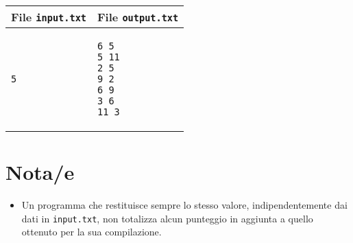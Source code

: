 \documentclass[a4paper,11pt]{article}
\begin{document}
    \noindent
    \begin{tabular}{p{11cm}|p{5cm}}
    \toprule
    \textbf{File \texttt{input.txt}}
    & \textbf{File \texttt{output.txt}}
    \\
    \midrule
    \scriptsize
    \begin{verbatim}
5
\end{verbatim}
    &
    \scriptsize
    \begin{verbatim}
6 5
5 11
2 5
9 2
6 9
3 6
11 3
\end{verbatim}
    \\
    \bottomrule
    \end{tabular}
  
\section*{Nota/e}
\begin{itemize}
  
    \item Un programma che restituisce sempre lo stesso valore,
indipendentemente dai dati in \texttt{input.txt}, non totalizza
alcun punteggio in aggiunta a quello ottenuto per la sua
compilazione.
\end{itemize}
\end{document}
